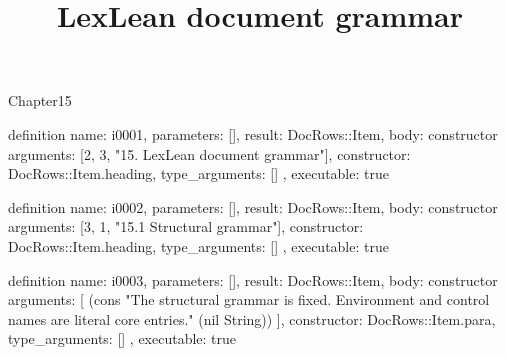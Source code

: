 \begin{lexlean}{Chapter15}
\title{LexLean document grammar}
\begin{semanticmodule}
definition{
  name: i0001,
  parameters: [],
  result: DocRows::Item,
  body: constructor{
    arguments: [2, 3, "15. LexLean document grammar"],
    constructor: DocRows::Item.heading,
    type_arguments: []
  },
  executable: true
}

definition{
  name: i0002,
  parameters: [],
  result: DocRows::Item,
  body: constructor{
    arguments: [3, 1, "15.1 Structural grammar"],
    constructor: DocRows::Item.heading,
    type_arguments: []
  },
  executable: true
}

definition{
  name: i0003,
  parameters: [],
  result: DocRows::Item,
  body: constructor{
    arguments: [
      (cons "The structural grammar is fixed. Environment and control names are literal core entries." (nil String))
    ],
    constructor: DocRows::Item.para,
    type_arguments: []
  },
  executable: true
}


\end{semanticmodule}
\end{lexlean}
